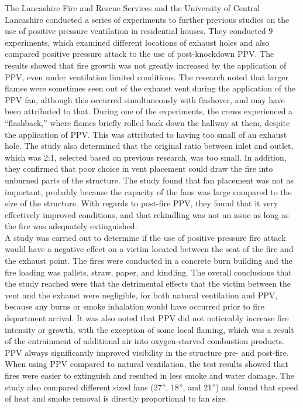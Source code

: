 \documentclass{article}
\begin{document}
The Lancashire Fire and Rescue Services and the University of Central Lancashire conducted a series of experiments to further previous studies on the use of positive pressure ventilation in residential houses. They conducted 9 experiments, which examined different locations of exhaust holes and also compared positive pressure attack to the use of post-knockdown PPV. The results showed that fire growth was not greatly increased by the application of PPV, even under ventilation limited conditions. The research noted that larger flames were sometimes seen out of the exhaust vent during the application of the PPV fan, although this occurred simultaneously with flashover, and may have been attributed to that. During one of the experiments, the crews experienced a “flashback,” where flames briefly rolled back down the hallway at them, despite the application of PPV. This was attributed to having too small of an exhaust hole. The study also determined that the original ratio between inlet and outlet, which was 2:1, selected based on previous research, was too small. In addition, they confirmed that poor choice in vent placement could draw the fire into unburned parts of the structure. The study found that fan placement was not as important, probably because the capacity of the fans was large compared to the size of the structure. With regards to post-fire PPV, they found that it very effectively improved conditions, and that rekindling was not an issue as long as the fire was adequately extinguished.\cite{StottPreston}\\
	
A study was carried out to determine if the use of positive pressure fire attack would have a negative effect on a victim located between the seat of the fire and the exhaust point. The fires were conducted in a concrete burn building and the fire loading was pallets, straw, paper, and kindling. The overall conclusions that the study reached were that the detrimental effects that the victim between the vent and the exhaust were negligible, for both natural ventilation and PPV, because any burns or smoke inhalation would have occurred prior to fire department arrival. It was also noted that PPV did not noticeably increase fire intensity or growth, with the exception of some local flaming, which was a result of the entrainment of additional air into oxygen-starved combustion products. PPV always significantly improved visibility in the structure pre- and post-fire. When using PPV compared to natural ventilation, the test results showed that fires were easier to extinguish and resulted in less smoke and water damage. The study also compared different sized fans (27”, 18”, and 21”) and found that speed of heat and smoke removal is directly proportional to fan size.\cite{BowserFireServiceCollege}\\
	
\end{document}
